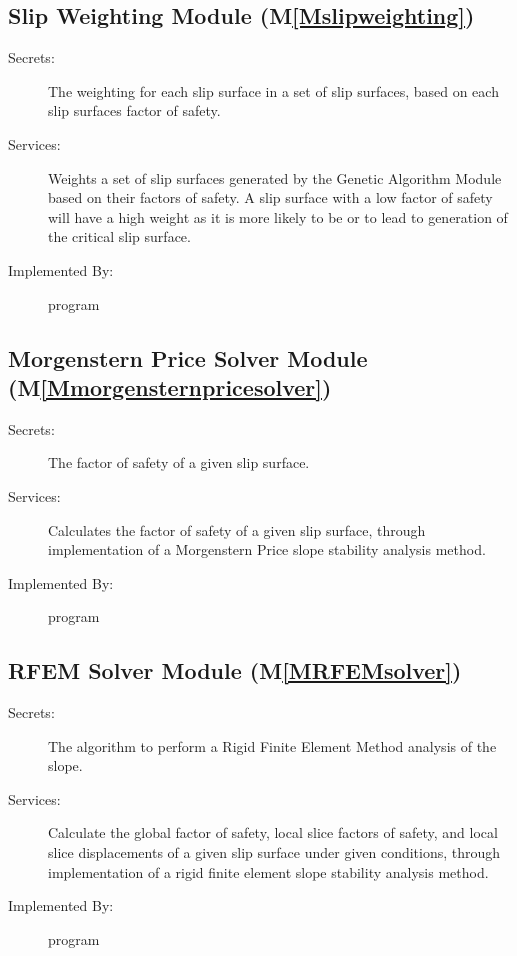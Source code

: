 \documentclass[12pt]{article}
\begin{document}
\subsection{Slip Weighting Module (M\ref{Mslipweighting})}
\label{Sec:SWM()}
\begin{description}
\item[Secrets:]The weighting for each slip surface in a set of slip surfaces, based on each slip surfaces factor of safety.
\item[Services:]Weights a set of slip surfaces generated by the Genetic Algorithm Module based on their factors of safety. A slip surface with a low factor of safety will have a high weight as it is more likely to be or to lead to generation of the critical slip surface.
\item[Implemented By:]program
\end{description}
\subsection{Morgenstern Price Solver Module (M\ref{Mmorgensternpricesolver})}
\label{Sec:MPSM()}
\begin{description}
\item[Secrets:]The factor of safety of a given slip surface.
\item[Services:]Calculates the factor of safety of a given slip surface, through implementation of a Morgenstern Price slope stability analysis method.
\item[Implemented By:]program
\end{description}
\subsection{RFEM Solver Module (M\ref{MRFEMsolver})}
\label{Sec:RSM()}
\begin{description}
\item[Secrets:]The algorithm to perform a Rigid Finite Element Method analysis of the slope.
\item[Services:]Calculate the global factor of safety, local slice factors of safety, and local slice displacements of a given slip surface under given conditions, through implementation of a rigid finite element slope stability analysis method.
\item[Implemented By:]program
\end{description}
\end{document}
